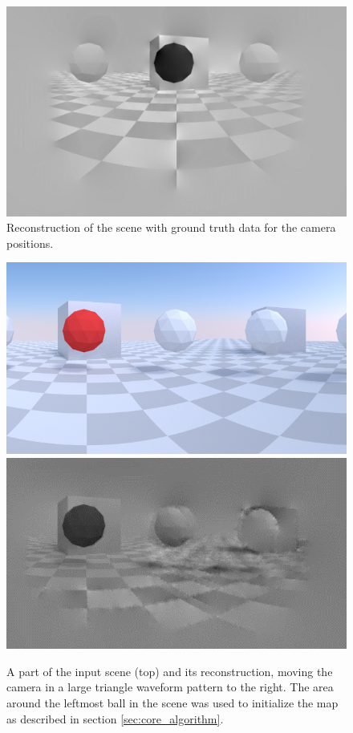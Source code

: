 \begin{figure}
\includegraphics[width=\linewidth]{images/simulation_reconstruction.jpg}
\caption{Reconstruction of the scene with ground truth data for the camera positions.}
\label{fig:reconstruction_only}
\end{figure}

\begin{figure}
\includegraphics[width=\columnwidth]{images/zigzag_input.png}
\includegraphics[width=\columnwidth]{images/zigzag_reconstruction.png}
\caption{A part of the input scene (top) and its reconstruction,
moving the camera in a large triangle waveform pattern to the right.
The area around the leftmost ball in the scene was used to initialize
the map as described in section \ref{sec:core_algorithm}.}
\label{fig:zigzag_reconstruction}
\end{figure}

